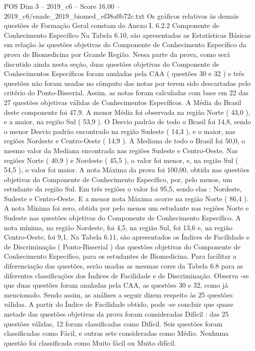 \begin{textsample}{POS Dim 3 – 2019\_c6 – Score 16.00 – 2019\_c6/enade\_2019\_biomed\_ef38a0b72c.txt}
Os gráficos relativos às demais questões de Formação Geral constam do Anexo I. 6.2.2 Componente de Conhecimento Específico Na Tabela 6.10, são apresentadas as Estatísticas Básicas em relação às questões objetivas do Componente de Conhecimento Específico da prova de Biomedicina por Grande Região.
Nessa parte da prova, como será discutido ainda nesta seção, duas questões objetivas do Componente de Conhecimentos Específicos foram anuladas pela CAA ( questões 30 e 32 ) e três questões não foram usadas no cômputo das notas por terem sido descartadas pelo critério do Ponto-Bisserial.
Assim, as notas foram calculadas com base em 22 das 27 questões objetivas válidas de Conhecimentos Específicos.
A Média do Brasil deste componente foi 47,9.
A menor Média foi observada na região Norte ( 43,0 ), e a maior, na região Sul ( 53,9 ).
O Desvio padrão de todo o Brasil foi 14,8, sendo o menor Desvio padrão encontrado na região Sudeste ( 14,3 ), e o maior, nas regiões Nordeste e Centro-Oeste ( 14,9 ).
A Mediana de todo o Brasil foi 50,0, o mesmo valor da Mediana encontrada nas regiões Sudeste e Centro-Oeste.
Nas regiões Norte ( 40,9 ) e Nordeste ( 45,5 ), o valor foi menor, e, na região Sul ( 54,5 ), o valor foi maior.
A nota Máxima da prova foi 100,00, obtida nas questões objetivas do Componente de Conhecimento Específico, por, pelo menos, um estudante da região Sul.
Em três regiões o valor foi 95,5, sendo elas : Nordeste, Sudeste e Centro-Oeste.
E a menor nota Máxima ocorre na região Norte ( 86,4 ).
A nota Mínima foi zero, obtida por pelo menos um estudante nas regiões Norte e Sudeste nas questões objetivas do Componente de Conhecimento Específico.
A nota mínima, na região Nordeste, foi 4,5, na região Sul, foi 13,6 e, na região Centro-Oeste, foi 9,1.
Na Tabela 6.11, são apresentados os Índices de Facilidade e de Discriminação ( Ponto-Bisserial ) das questões objetivas do Componente de Conhecimento Específico, para os estudantes de Biomedicina.
Para facilitar a diferenciação das questões, serão usadas as mesmas cores da Tabela 6.8 para as diferentes classificações dos Índices de Facilidade e de Discriminação.
Observa -se que duas questões foram anuladas pela CAA, as questões 30 e 32, como já mencionado.
Sendo assim, as análises a seguir dizem respeito às 25 questões válidas.
A partir do Índice de Facilidade obtido, pode -se concluir que quase metade das questões objetivas da prova foram consideradas Difícil : das 25 questões válidas, 12 foram classificadas como Difícil.
Seis questões foram classificadas como Fácil, e outras sete consideradas como Médio.
Nenhuma questão foi classificada como Muito fácil ou Muito difícil.

\end{textsample}
